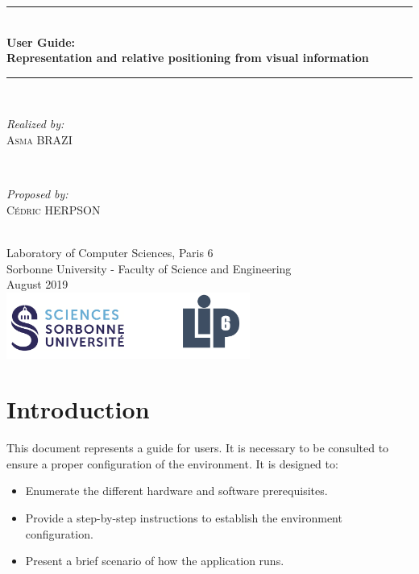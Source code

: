 \documentclass[12pt]{report}
\begin{document}
\begin{titlepage}

\newcommand{\HRule}{\rule{\linewidth}{0.5mm}} %

\center 
\HRule \\[0.4cm]
{ \huge \bfseries User Guide: \\Representation and relative positioning from visual information}\\[0.4cm]
\HRule \\[1.5cm]

\begin{minipage}{0.4\textwidth}
	\begin{flushleft} \large
		\emph{Realized by:}\\
		\textsc{Asma BRAZI}
	\end{flushleft}
\end{minipage}
~
\begin{minipage}{0.4\textwidth}
	\begin{flushright} \large
		\emph{Proposed by:} \\
		\textsc{Cédric HERPSON}\\
	\end{flushright}
\end{minipage}\\[4cm]


{\large Laboratory of Computer Sciences, Paris 6 \\ Sorbonne University - Faculty of Science and Engineering}\\[3cm] 
{\large August 2019 }\\[3cm] 
\includegraphics[width=0.6\textwidth]{logo.png}\\[1cm] 
\vfill %

\end{titlepage}
\tableofcontents
\chapter{Introduction}
This document represents a guide for users. It is necessary to be consulted to ensure a proper configuration of the environment. It is designed to:
\begin{itemize}
    \item Enumerate the different hardware and software prerequisites.
    \item Provide a step-by-step instructions to establish the environment configuration.
    \item Present a brief scenario of how the application runs.
\end{itemize}
\end{document}
